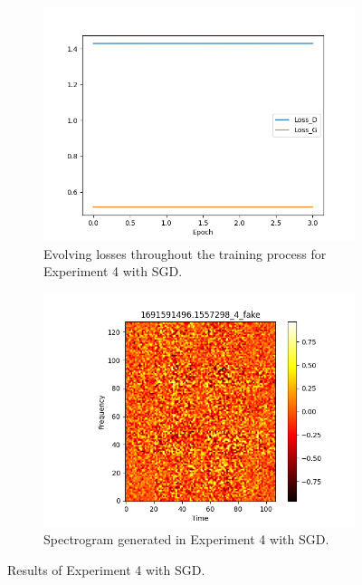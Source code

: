 \begin{figure}[!ht]
    \centering
    \begin{subfigure}{0.45\textwidth}
        \includegraphics[width=\textwidth]{figures/4.5-results/exp4_sgd_loss.png}
        \caption{Evolving losses throughout the training process for Experiment 4 with \ac{SGD}.}
        \label{fig:exp4_sgd_loss}
    \end{subfigure}
    \begin{subfigure}{0.45\textwidth}
        \includegraphics[width=\textwidth]{figures/4.5-results/exp4_sgd_spectrogram.png}
        \caption{Spectrogram generated in Experiment 4 with \ac{SGD}.}
        \label{fig:exp4_sgd_spectrogram}
    \end{subfigure}
    \caption{Results of Experiment 4 with \ac{SGD}.}
    \label{fig:exp4_sgd_results}
\end{figure}